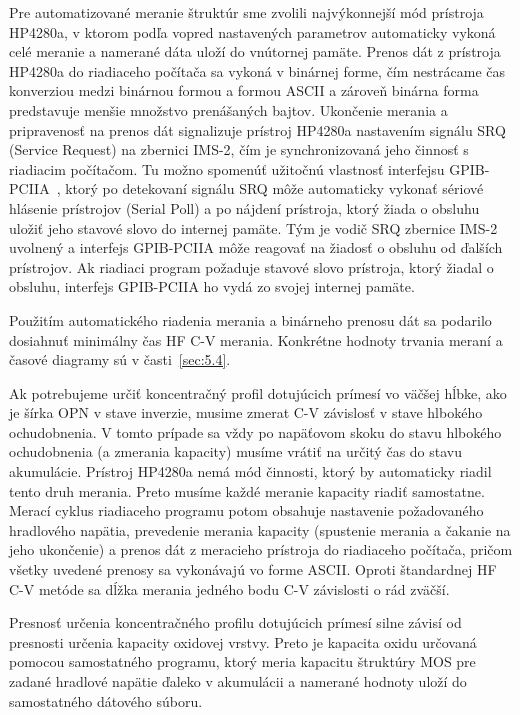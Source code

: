 Pre automatizované meranie štruktúr sme zvolili najvýkonnejší mód
prístroja HP4280a, v ktorom podľa vopred nastavených parametrov
automaticky vykoná celé meranie a namerané dáta uloží do vnútornej
pamäte.  Prenos dát z prístroja HP4280a do riadiaceho počítača sa
vykoná v binárnej forme, čím nestrácame čas konverziou medzi binárnou
formou a formou ASCII a zároveň binárna forma predstavuje menšie
množstvo prenášaných bajtov. Ukončenie merania a pripravenosť na
prenos dát signalizuje prístroj HP4280a nastavením signálu SRQ
(Service Request) na zbernici IMS-2, čím je synchronizovaná jeho
činnosť s riadiacim počítačom.  Tu možno spomenúť užitočnú vlastnosť
interfejsu GPIB-PCIIA~\cite{5.2}, ktorý po detekovaní signálu SRQ môže
automaticky vykonať sériové hlásenie prístrojov (Serial Poll) a po
nájdení prístroja, ktorý žiada o obsluhu uložiť jeho stavové slovo do
internej pamäte. Tým je vodič SRQ zbernice IMS-2 uvolnený a interfejs
GPIB-PCIIA môže reagovať na žiadosť o obsluhu od ďalších
prístrojov. Ak riadiaci program požaduje stavové slovo prístroja,
ktorý žiadal o obsluhu, interfejs GPIB-PCIIA ho vydá zo svojej
internej pamäte.

Použitím automatického riadenia merania a binárneho prenosu dát sa
podarilo dosiahnuť minimálny čas HF C-V merania.  Konkrétne hodnoty
trvania meraní a časové diagramy sú v časti~\ref{sec:5.4}.

Ak potrebujeme určiť koncentračný profil dotujúcich prímesí vo väčšej
hĺbke, ako je šírka OPN v stave inverzie, musime zmerat C-V závislosť
v stave hlbokého ochudobnenia. V tomto prípade sa vždy po napäťovom
skoku do stavu hlbokého ochudobnenia (a zmerania kapacity) musíme
vrátiť na určitý čas do stavu akumulácie. Prístroj HP4280a nemá mód
činnosti, ktorý by automaticky riadil tento druh merania. Preto musíme
každé meranie kapacity riadiť samostatne. Merací cyklus riadiaceho
programu potom obsahuje nastavenie požadovaného hradlového napätia,
prevedenie merania kapacity (spustenie merania a čakanie na jeho
ukončenie) a prenos dát z meracieho prístroja do riadiaceho počítača,
pričom všetky uvedené prenosy sa vykonávajú vo forme ASCII\@. Oproti
štandardnej HF C-V metóde sa dĺžka merania jedného bodu C-V závislosti
o rád zväčší.

Presnosť určenia koncentračného profilu dotujúcich prímesí silne
závisí od presnosti určenia kapacity oxidovej vrstvy.  Preto je
kapacita oxidu určovaná pomocou samostatného programu, ktorý meria
kapacitu štruktúry MOS pre zadané hradlové napätie ďaleko v akumulácii
a namerané hodnoty uloží do samostatného dátového súboru.


